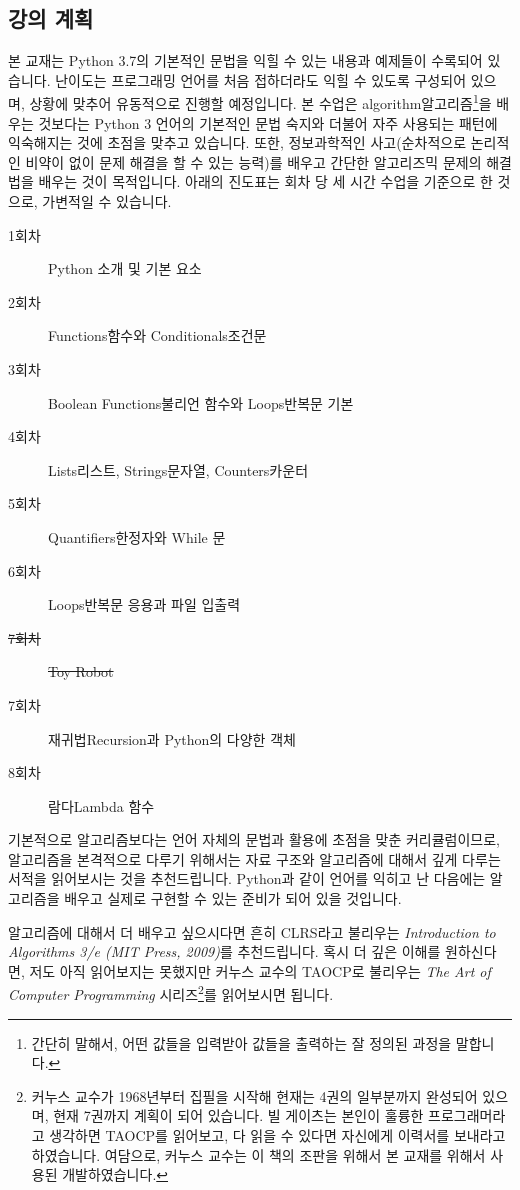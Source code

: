 \documentclass[../main.tex]{subfiles}
\begin{document}
\subsection{강의 계획}
본 교재는 Python 3.7의 기본적인 문법을 익힐 수 있는 내용과 예제들이 수록되어 있습니다.
난이도는 프로그래밍 언어를 처음 접하더라도 익힐 수 있도록 구성되어 있으며, 상황에 맞추어 유동적으로 진행할 예정입니다.
본 수업은 algorithm알고리즘\footnote{간단히 말해서, 어떤 값들을 입력받아 값들을 출력하는 잘 정의된 과정을 말합니다.}을 배우는 것보다는 Python 3 언어의 기본적인 문법 숙지와 더불어 자주 사용되는 패턴에 익숙해지는 것에 초점을 맞추고 있습니다.
또한, 정보과학적인 사고(순차적으로 논리적인 비약이 없이 문제 해결을 할 수 있는 능력)를 배우고 간단한 알고리즈믹 문제의 해결법을 배우는 것이 목적입니다.
아래의 진도표는 회차 당 세 시간 수업을 기준으로 한 것으로, 가변적일 수 있습니다.

\begin{description}
  \item[1회차] Python 소개 및 기본 요소
  \item[2회차] Functions함수와 Conditionals조건문
  \item[3회차] Boolean Functions불리언 함수와 Loops반복문 기본
  \item[4회차] Lists리스트, Strings문자열, Counters카운터
  \item[5회차] Quantifiers한정자와 While 문
  \item[6회차] Loops반복문 응용과 파일 입출력
  \item[\sout{7회차}] \sout{Toy Robot}
  \item[7회차] 재귀법Recursion과 Python의 다양한 객체
  \item[8회차] 람다Lambda 함수
\end{description}

기본적으로 알고리즘보다는 언어 자체의 문법과 활용에 초점을 맞춘 커리큘럼이므로, 알고리즘을 본격적으로 다루기 위해서는 자료 구조와 알고리즘에 대해서 깊게 다루는 서적을 읽어보시는 것을 추천드립니다.
Python과 같이 언어를 익히고 난 다음에는 알고리즘을 배우고 실제로 구현할 수 있는 준비가 되어 있을 것입니다.

알고리즘에 대해서 더 배우고 싶으시다면 흔히 CLRS라고 불리우는 \textit{Introduction to Algorithms 3/e (MIT Press, 2009)}를 추천드립니다.
혹시 더 깊은 이해를 원하신다면, 저도 아직 읽어보지는 못했지만 커누스 교수의 TAOCP로 불리우는 \textit{The Art of Computer Programming} 시리즈\footnote{커누스 교수가 1968년부터 집필을 시작해 현재는 4권의 일부분까지 완성되어 있으며, 현재 7권까지 계획이 되어 있습니다. 빌 게이츠는 본인이 훌륭한 프로그래머라고 생각하면 TAOCP를 읽어보고, 다 읽을 수 있다면 자신에게 이력서를 보내라고 하였습니다. 여담으로, 커누스 교수는 이 책의 조판을 위해서 본 교재를 위해서 사용된  개발하였습니다.}를 읽어보시면 됩니다.
\end{document}
